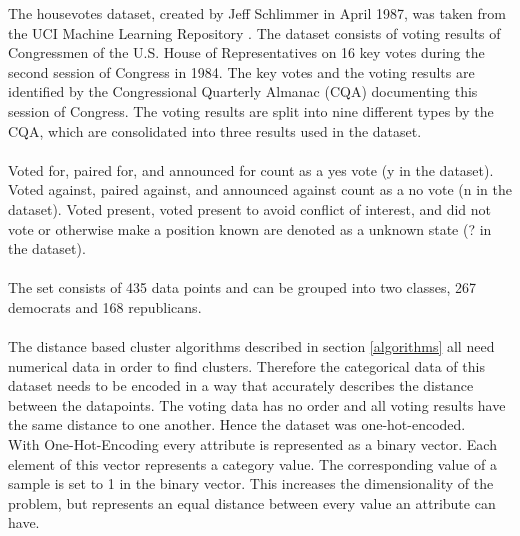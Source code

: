 \marginnote{\textcolor{cyan}{Niklas Conen}}
The housevotes dataset, created by Jeff Schlimmer in April 1987, was taken from the UCI Machine Learning Repository \cite{Dua2019}. The dataset consists of voting results of Congressmen of the U.S. House of Representatives on 16 key votes during the second session of Congress in 1984. The key votes and the voting results are identified by the Congressional Quarterly Almanac (CQA) documenting this session of Congress. The voting results are split into nine different types by the CQA, which are consolidated into three results used in the dataset.\\
\ \\
Voted for, paired for, and announced for count as a yes vote (y in the dataset).
Voted against, paired against, and announced against count as a no vote (n in the dataset).
Voted present, voted present to avoid conflict of interest, and did not vote or otherwise make a position known are denoted as a unknown state (? in the dataset).\\
\ \\
The set consists of 435 data points and can be grouped into two classes, 267 democrats and 168 republicans.\\
\ \\
The distance based cluster algorithms described in section \ref{algorithms} all need numerical data in order to find clusters. Therefore the categorical data of this dataset needs to be encoded in a way that accurately describes the distance between the datapoints. The voting data has no order and all voting results have the same distance to one another. Hence the dataset was one-hot-encoded.\\
With One-Hot-Encoding every attribute is represented as a binary vector. Each element of this vector represents a category value. The corresponding value of a sample is set to 1 in the binary vector. 
This increases the dimensionality of the problem, but represents an equal distance between every value an attribute can have.\\

